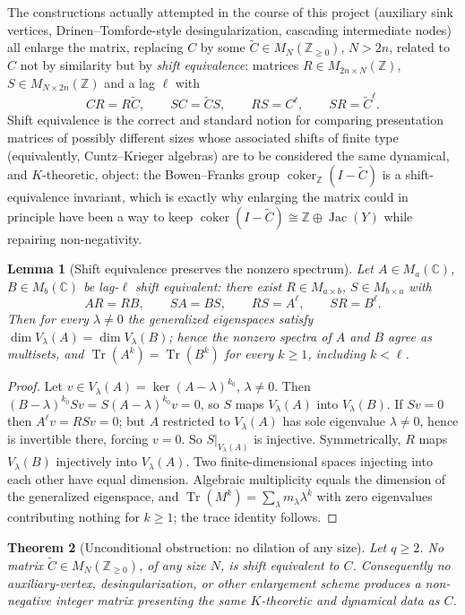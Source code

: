 \documentclass[11pt]{amsart}
\numberwithin{equation}{section}
\newtheorem{theorem}{Theorem}[section]
\newtheorem{lemma}[theorem]{Lemma}
\theoremstyle{definition}
\theoremstyle{remark}
\newcommand{\Z}{\mathbb{Z}}
\newcommand{\C}{\mathbb{C}}
\newcommand{\Tr}{\operatorname{Tr}}
\newcommand{\coker}{\operatorname{coker}}
\newcommand{\Jac}{\operatorname{Jac}}
\begin{document}
The constructions actually attempted in the course of this project (auxiliary sink
vertices, Drinen--Tomforde-style desingularization, cascading intermediate nodes) all
enlarge the matrix, replacing $C$ by some $\widetilde C\in M_N(\Z_{\ge0})$, $N>2n$,
related to $C$ not by similarity but by \emph{shift equivalence}: matrices $R\in
M_{2n\times N}(\Z)$, $S\in M_{N\times2n}(\Z)$ and a lag $\ell$ with
\[
CR=R\widetilde C,\qquad SC=\widetilde CS,\qquad RS=C^\ell,\qquad SR=\widetilde C^\ell.
\]
Shift equivalence is the correct and standard notion for comparing presentation
matrices of possibly different sizes whose associated shifts of finite type (equivalently,
Cuntz--Krieger algebras) are to be considered the same dynamical, and $K$-theoretic,
object: the Bowen--Franks group $\coker_\Z(I-\widetilde C)$ is a shift-equivalence
invariant, which is exactly why enlarging the matrix could in principle have been a way
to keep $\coker(I-\widetilde C)\cong\Z\oplus\Jac(Y)$ while repairing non-negativity.

\begin{lemma}[Shift equivalence preserves the nonzero spectrum]\label{lem:se}
Let $A\in M_a(\C)$, $B\in M_b(\C)$ be lag-$\ell$ shift equivalent: there exist
$R\in M_{a\times b}$, $S\in M_{b\times a}$ with
\[
AR=RB,\qquad SA=BS,\qquad RS=A^\ell,\qquad SR=B^\ell .
\]
Then for every $\lambda\neq0$ the generalized eigenspaces satisfy
$\dim V_\lambda(A)=\dim V_\lambda(B)$; hence the nonzero spectra of $A$ and $B$ agree as
multisets, and $\Tr(A^k)=\Tr(B^k)$ for \emph{every} $k\ge1$, including $k<\ell$.
\end{lemma}

\begin{proof}
Let $v\in V_\lambda(A)=\ker(A-\lambda)^{k_0}$, $\lambda\neq0$. Then
$(B-\lambda)^{k_0}Sv=S(A-\lambda)^{k_0}v=0$, so $S$ maps $V_\lambda(A)$ into
$V_\lambda(B)$. If $Sv=0$ then $A^\ell v=RSv=0$; but $A$ restricted to $V_\lambda(A)$
has sole eigenvalue $\lambda\neq0$, hence is invertible there, forcing $v=0$. So
$S|_{V_\lambda(A)}$ is injective. Symmetrically, $R$ maps $V_\lambda(B)$ injectively
into $V_\lambda(A)$. Two finite-dimensional spaces injecting into each other have equal
dimension. Algebraic multiplicity equals the dimension of the generalized eigenspace,
and $\Tr(M^k)=\sum_\lambda m_\lambda\lambda^k$ with zero eigenvalues contributing
nothing for $k\ge1$; the trace identity follows.
\end{proof}

\begin{theorem}[Unconditional obstruction: no dilation of any size]\label{thm:traceany}
Let $q\ge2$. No matrix $\widetilde C\in M_N(\Z_{\ge0})$, of any size $N$, is shift
equivalent to $C$. Consequently no auxiliary-vertex, desingularization, or other
enlargement scheme produces a non-negative integer matrix presenting the same
$K$-theoretic and dynamical data as $C$.
\end{theorem}
\end{document}
